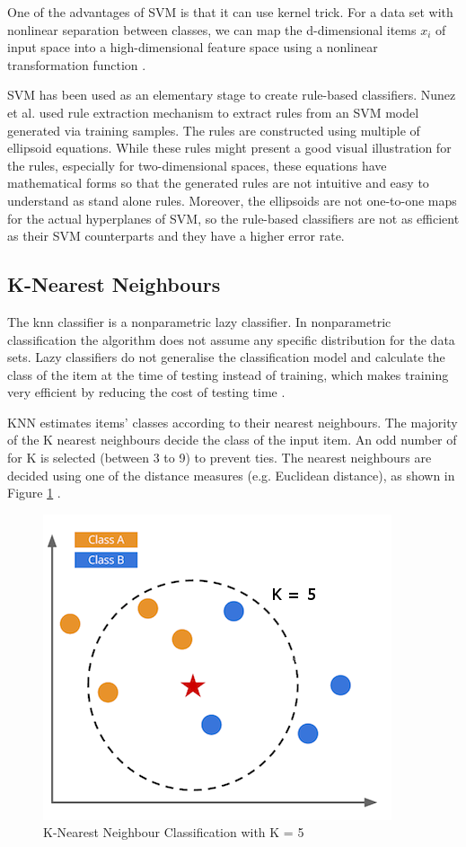 One of the advantages of SVM is that it can use kernel trick. For a data set with nonlinear separation between classes, we can map the d-dimensional items $x_i$ of input space into a high-dimensional feature space using a nonlinear transformation function \cite{Zaki2014}. 


SVM has been used as an elementary stage to create rule-based classifiers. Nunez et al. \cite{Nunez2006} used rule extraction mechanism to extract rules from an SVM model generated via training samples. The rules are constructed using multiple of ellipsoid equations. While these rules might present a good visual illustration for the rules, especially for two-dimensional spaces, these equations have mathematical forms so that the generated rules are not intuitive and easy to understand as stand alone rules. Moreover, the ellipsoids are not one-to-one maps for the actual hyperplanes of SVM, so the rule-based classifiers are not as efficient as their SVM counterparts and they have a higher error rate.



\subsection{K-Nearest Neighbours}
The \acrfull{knn} classifier is a nonparametric lazy classifier. In nonparametric classification the algorithm does not assume any specific distribution for the data sets. Lazy classifiers do not generalise the classification model and calculate the class of the item at the time of testing instead of training, which makes training very efficient by reducing the cost of testing time \cite{Wettschereck1997}. 

KNN estimates items' classes according to their nearest neighbours. The majority of the K nearest neighbours decide the class of the input item. An odd number of for K is selected (between 3 to 9) to prevent ties. The nearest neighbours are decided using one of the distance measures (e.g. Euclidean distance), as shown in Figure \ref{fig:KNN} \cite{Zaki2014}. 

\begin{figure}[!h]

    \includegraphics[scale=0.9]{images/chapter2/KNN.png}
    \caption{K-Nearest Neighbour Classification with K = 5}
    \label{fig:KNN}
\end{figure}

